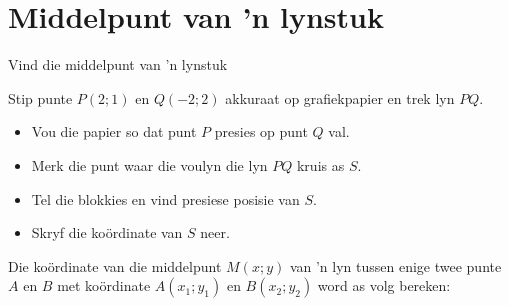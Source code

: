 %     
%     
%     
\clearpage
\section{Middelpunt van ’n lynstuk}
\begin{Investigation}{Vind die middelpunt van 'n lynstuk}
\item Stip punte $P(2;1)$ en $Q(-2;2)$ akkuraat op grafiekpapier en trek lyn $PQ$.
\begin{itemize}
 \item Vou die papier so dat punt $P$ presies op punt $Q$ val.
\item Merk die punt waar die voulyn die lyn $PQ$ kruis as $S$.
\item Tel die blokkies en vind presiese posisie van $S$.
\item Skryf die ko\"ordinate van $S$ neer.
\end{itemize}

\end{Investigation}
Die koördinate van die middelpunt $M(x;y)$ van ’n lyn tussen enige twee punte $A$ en $ B$ met koördinate $A(x_1;y_1)$ en $B(x_2;y_2)$ word as volg bereken:

